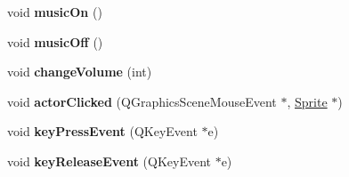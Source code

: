 \begin{DoxyCompactItemize}
\mbox{\label{class_main_window_acbb51ed12285e43995e2795c0a8b847b}} 
void {\bfseries music\+On} ()
\item 
\mbox{\label{class_main_window_a00caa93f8f96a6b5b1d6c991afc090b6}} 
void {\bfseries music\+Off} ()
\item 
\mbox{\label{class_main_window_a7eada83031022060e247636a27d4b6fc}} 
void {\bfseries change\+Volume} (int)
\item 
\mbox{\label{class_main_window_a09fe9270f0534ecf9e7acea4d1eaf8c4}} 
void {\bfseries actor\+Clicked} (Q\+Graphics\+Scene\+Mouse\+Event $\ast$, \hyperlink{class_sprite}{Sprite} $\ast$)
\item 
\mbox{\label{class_main_window_adf88315e557e377353059bd313b1bfa6}} 
void {\bfseries key\+Press\+Event} (Q\+Key\+Event $\ast$e)
\item 
\mbox{\label{class_main_window_a04b0c8ff3be04d1b1bf54e78c5ee7039}} 
void {\bfseries key\+Release\+Event} (Q\+Key\+Event $\ast$e)
\end{DoxyCompactItemize}
